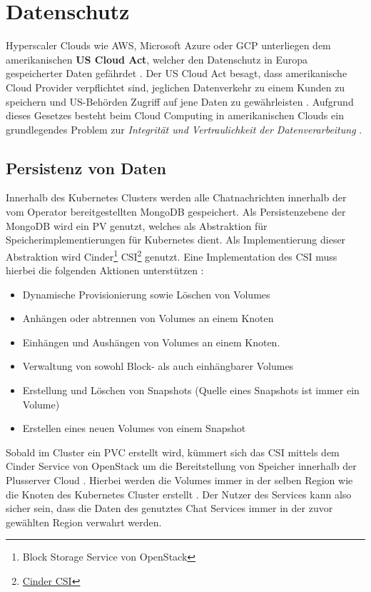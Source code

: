 \chapter{Datenschutz}
\label{chapter:datenschutz}
Hyperscaler Clouds wie \ac{AWS}, Microsoft Azure oder \ac{GCP} unterliegen dem amerikanischen \textbf{US Cloud Act}, welcher
den Datenschutz in Europa gespeicherter Daten gefährdet \cite{Kagermann2021}. Der US Cloud Act besagt,
dass amerikanische Cloud Provider verpflichtet sind, jeglichen Datenverkehr zu einem Kunden zu speichern und 
US-Behörden Zugriff auf jene Daten zu gewährleisten \cite{CloudAct2018}.
Aufgrund dieses Gesetzes besteht beim Cloud Computing in amerikanischen Clouds ein grundlegendes Problem 
zur \emph{Integrität und Vertraulichkeit der Datenverarbeitung} \cite{Weichert2010}.


\section{Persistenz von Daten}
\label{subsec:datenschutz:persistenz}
Innerhalb des Kubernetes Clusters werden alle Chatnachrichten innerhalb der vom Operator bereitgestellten MongoDB gespeichert.
Als Persistenzebene der MongoDB wird ein \ac{PV} genutzt,
welches als Abstraktion für Speicherimplementierungen für Kubernetes dient.
Als Implementierung dieser Abstraktion wird 
Cinder\footnote{Block Storage Service von OpenStack} \ac{CSI}\footnote{\href{https://github.com/kubernetes/cloud-provider-openstack/tree/master/pkg/csi/cinder}{Cinder CSI}} genutzt. 
Eine Implementation des \ac{CSI} muss hierbei die folgenden Aktionen unterstützen \cite{container-storage-interface_2021}:
\begin{itemize}
  \item Dynamische Provisionierung sowie Löschen von Volumes
  \item Anhängen oder abtrennen von Volumes an einem Knoten
  \item Einhängen und Aushängen von Volumes an einem Knoten.
  \item Verwaltung von sowohl Block- als auch einhängbarer Volumes
  \item Erstellung und Löschen von Snapshots (Quelle eines Snapshots ist immer ein Volume)
  \item Erstellen eines neuen Volumes von einem Snapshot
\end{itemize}

Sobald im Cluster ein \ac{PVC} erstellt wird, kümmert sich das \ac{CSI} mittels dem Cinder Service von OpenStack 
um die Bereitstellung von Speicher innerhalb der Plusserver Cloud \cite{cinderCSI}.
Hierbei werden die Volumes immer in der selben Region wie die Knoten des Kubernetes Cluster erstellt \cite{kubernetesVolumes}.
Der Nutzer des Services kann also sicher sein, dass die Daten des genutztes Chat Services immer in der zuvor 
gewählten Region verwahrt werden.